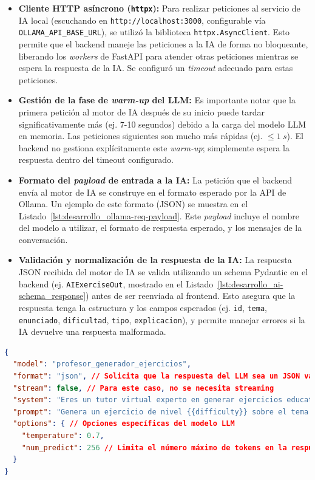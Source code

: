 \begin{itemize}[leftmargin=*]
  \item \textbf{Cliente HTTP asíncrono (\texttt{httpx}):} Para realizar peticiones al servicio de IA local (escuchando en \texttt{http://localhost:3000}, configurable vía \texttt{OLLAMA\_API\_BASE\_URL}), se utilizó la biblioteca \texttt{httpx.AsyncClient}. Esto permite que el backend maneje las peticiones a la IA de forma no bloqueante, liberando los \emph{workers} de FastAPI para atender otras peticiones mientras se espera la respuesta de la IA. Se configuró un \emph{timeout} adecuado para estas peticiones.
  \item \textbf{Gestión de la fase de \emph{warm-up} del LLM:} Es importante notar que la primera petición al motor de IA después de su inicio puede tardar significativamente más (ej. 7-10 segundos) debido a la carga del modelo LLM en memoria. Las peticiones siguientes son mucho más rápidas (ej. \( \le \SI{1}{s} \)). El backend no gestiona explícitamente este \emph{warm-up}; simplemente espera la respuesta dentro del timeout configurado.
  \item \textbf{Formato del \emph{payload} de entrada a la IA:} La petición que el backend envía al motor de IA se construye en el formato esperado por la API de Ollama. Un ejemplo de este formato (JSON) se muestra en el Listado~\ref{lst:desarrollo_ollama-req-payload}. Este \emph{payload} incluye el nombre del modelo a utilizar, el formato de respuesta esperado, y los mensajes de la conversación.
  \item \textbf{Validación y normalización de la respuesta de la IA:} La respuesta JSON recibida del motor de IA se valida utilizando un schema Pydantic en el backend (ej. \texttt{AIExerciseOut}, mostrado en el Listado~\ref{lst:desarrollo_ai-schema_response}) antes de ser reenviada al frontend. Esto asegura que la respuesta tenga la estructura y los campos esperados (ej. \texttt{id}, \texttt{tema}, \texttt{enunciado}, \texttt{dificultad}, \texttt{tipo}, \texttt{explicacion}), y permite manejar errores si la IA devuelve una respuesta malformada.
\end{itemize}

\begin{lstlisting}[language=json,
                   caption={Ejemplo de payload de petición al motor de IA (formato Ollama).},
                   label={lst:desarrollo_ollama-req-payload}, % Label actualizada
                   basicstyle=\fontsize{8}{9.5}\ttfamily]
{
  "model": "profesor_generador_ejercicios",
  "format": "json", // Solicita que la respuesta del LLM sea un JSON válido
  "stream": false, // Para este caso, no se necesita streaming
  "system": "Eres un tutor virtual experto en generar ejercicios educativos concisos y claros. El ejercicio debe ser autoevaluable y tener una respuesta única y bien definida. Proporciona también una explicación breve y clara de cómo resolverlo.",
  "prompt": "Genera un ejercicio de nivel {{difficulty}} sobre el tema \"{{theme_title}}\". El ejercicio debe ser de tipo {{exercise_type}}.",
  "options": { // Opciones específicas del modelo LLM
    "temperature": 0.7,
    "num_predict": 256 // Limita el número máximo de tokens en la respuesta
  }
}
\end{lstlisting}

